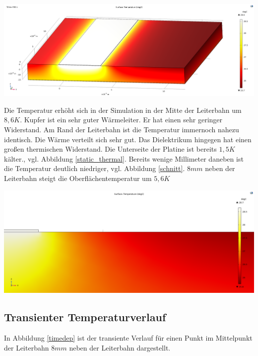 \documentclass[10pt,a4paper,oneside,abstracton]{scrartcl}
\newenvironment{Figure}
  {\par\medskip\noindent\minipage{\linewidth}}
  {\endminipage\par\medskip}
\begin{document}
\begin{multicols}{2}
\begin{Figure}
	\includegraphics[width=\textwidth]{Bilder/Thermal_static.png}
	\label{static_thermal}
\end{Figure}
\noindent
Die Temperatur erhöht sich in der Simulation in der Mitte der Leiterbahn um $8,6 K$.
Kupfer ist ein sehr guter Wärmeleiter. Er hat einen sehr geringer Widerstand. 
\newline
Am Rand der Leiterbahn ist die Temperatur immernoch nahezu identisch. Die Wärme verteilt sich sehr gut. 
Das Dielektrikum hingegen hat einen großen thermischen Widerstand. 
Die Unterseite der Platine ist bereits $1,5K$ kälter., vgl. Abbildung \ref{static_thermal}. 
\newline
Bereits wenige Millimeter daneben ist die Temperatur deutlich niedriger, vgl. Abbildung \ref{schnitt}.
$8 mm$ neben der Leiterbahn steigt die Oberflächentemperatur um $5,6 K$
\begin{Figure}
	\includegraphics[width=\textwidth]{Bilder/schnitt.png}
	\label{schnitt}
\end{Figure}

\subsection{Transienter Temperaturverlauf}
In Abbildung \ref{timedep} ist der transiente Verlauf für einen Punkt im Mittelpunkt der Leiterbahn 
$8 mm$ neben der Leiterbahn dargestellt.


\end{multicols}
\end{document}
